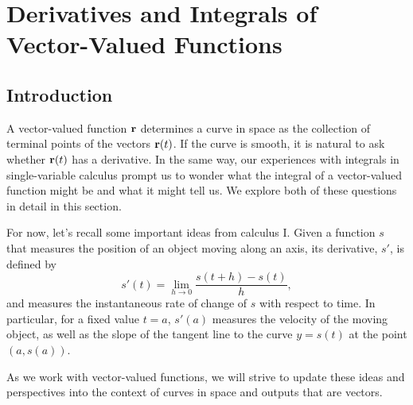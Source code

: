\section{Derivatives and Integrals of Vector-Valued Functions} \label{S:9.7.Vector_Valued_Functions_Derivatives}
 
\vspace*{-14 pt} 

\subsection*{Introduction}

A vector-valued function $\mathbf{r}$ determines a curve in space as the
collection of terminal points of the vectors $\mathbf{r}(t)$. If the curve is
smooth, it is natural to ask whether $\mathbf{r}(t)$ has a derivative.  In
the same way, our experiences with integrals in single-variable
calculus prompt us to wonder what the integral of a vector-valued
function might be and what it might tell us.  We
explore both of these questions in detail in this section.

For now, let's recall some important ideas from calculus I.  Given a
function $s$ that measures the position of an object moving along
an axis, its derivative, $s'$, is defined by
$$s'(t) = \lim_{h \to 0} \frac{s(t+h) - s(t)}{h},$$
and measures the instantaneous rate of change of $s$ with respect to
time.  In particular, for a fixed value $t = a$, $s'(a)$ measures the
velocity of the moving object, as well as the slope of the tangent
line to the curve $y = s(t)$ at the point $(a,s(a))$.

As we work with vector-valued functions, we will strive to update
these ideas and perspectives into the context of curves in space and
outputs that are vectors.

